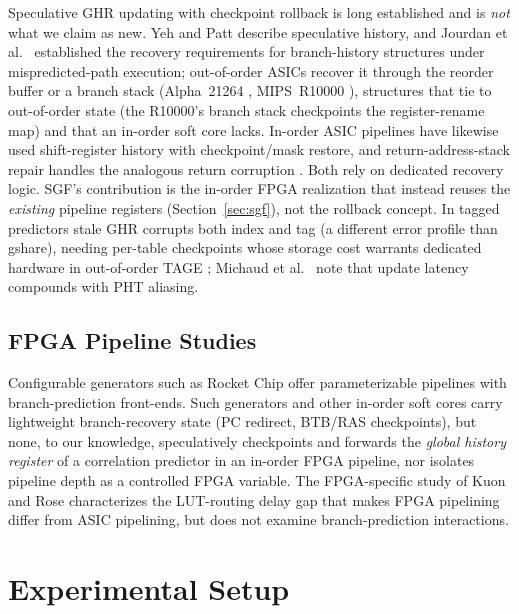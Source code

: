 \documentclass[acmsmall,nonacm,screen]{acmart}
\begin{document}
Speculative GHR updating with checkpoint rollback is long established and is \emph{not} what we claim as new.
Yeh and Patt \cite{yeh1991two} describe speculative history, and Jourdan et al.\ \cite{jourdan1997recovery} established the recovery requirements for branch-history structures under mispredicted-path execution; out-of-order ASICs recover it through the reorder buffer or a branch stack (Alpha~21264 \cite{kessler1999alpha}, MIPS~R10000 \cite{yeager1996mips}), structures that tie to out-of-order state (the R10000's branch stack checkpoints the register-rename map) and that an in-order soft core lacks. In-order ASIC pipelines have likewise used shift-register history with checkpoint/mask restore, and return-address-stack repair handles the analogous return corruption \cite{skadron1998improving}. Both rely on dedicated recovery logic. SGF's contribution is the in-order FPGA realization that instead reuses the \emph{existing} pipeline registers (Section~\ref{sec:sgf}), not the rollback concept.
In tagged predictors stale GHR corrupts both index and tag (a different error profile than gshare), needing per-table checkpoints \cite{seznec2011tage, seznec2006revisiting} whose storage cost warrants dedicated hardware in out-of-order TAGE \cite{schlais2016badgr}; Michaud et al.\ \cite{michaud1999trading} note that update latency compounds with PHT aliasing.

\subsection{FPGA Pipeline Studies}

Configurable generators such as Rocket Chip \cite{asanovic2016rocket} offer parameterizable pipelines with branch-prediction front-ends.
Such generators and other in-order soft cores carry lightweight branch-recovery state (PC redirect, BTB/RAS checkpoints), but none, to our knowledge, speculatively checkpoints and forwards the \emph{global history register} of a correlation predictor in an in-order FPGA pipeline, nor isolates pipeline depth as a controlled FPGA variable.
The FPGA-specific study of Kuon and Rose \cite{kuon2007measuring} characterizes the LUT-routing delay gap that makes FPGA pipelining differ from ASIC pipelining, but does not examine branch-prediction interactions.

\section{Experimental Setup}
\label{sec:methodology}
\end{document}
